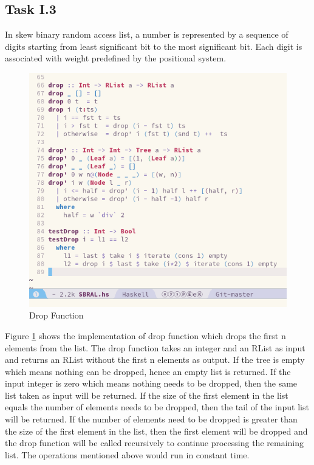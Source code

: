 \documentclass{article}
\begin{document}
\begin{normalsize}
  \section{Task I.3}

  In skew binary random access list, a number is represented by a sequence of digits starting from least significant bit to the most significant bit. Each digit is associated with weight predefined by the positional system.
  
  \begin{figure}[H]
    \centering
    \centerline{\includegraphics[scale=0.6]{SBRAL-Drop}}
    \caption{Drop Function}
    \label{fig:drop}
  \end{figure}

  Figure \ref{fig:drop} shows the implementation of drop function which drops the first n elements from the list. The drop function takes an integer and an RList as input and returns an RList without the first n elements as output. If the tree is empty which means nothing can be dropped, hence an empty list is returned. If the input integer is zero which means nothing needs to be dropped, then the same list taken as input will be returned. If the size of the first element in the list equals the number of elements needs to be dropped, then the tail of the input list will be returned. If the number of
  elements need to be dropped is greater than the size of the first element in the
  list, then the first element will be dropped and the drop function will be
  called recursively to continue processing the remaining list. The operations
  mentioned above would run in constant time.


\end{normalsize}
\end{document}
